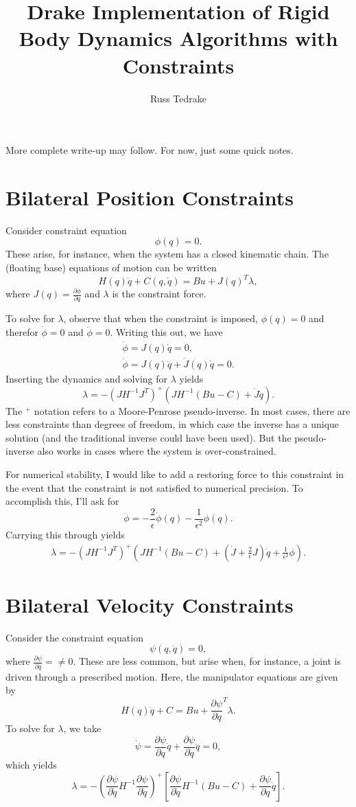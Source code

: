 \documentclass{article}
\title{Drake Implementation of Rigid Body Dynamics Algorithms with Constraints}
\author{Russ Tedrake}
\newcommand{\pd}[2]{\frac{\partial #1}{\partial #2}}
\begin{document}
\maketitle

More complete write-up may follow.  For now, just some quick notes.


\section{Bilateral Position Constraints}

Consider constraint equation $$\phi(q) = 0.$$  These arise, for
instance, when the system has a closed kinematic chain.  
The (floating base) equations of motion can be written 
$$H(q)\ddot{q} + C(q,\dot{q}) = B u + J(q)^T \lambda,$$
where $J(q) = \pd{\phi}{q}$ and $\lambda$ is the constraint force.

To solve for $\lambda$, observe that when the constraint is imposed, 
$\phi(q)=0$ and therefor $\dot{\phi}=0$ and $\ddot{\phi}=0$.  Writing
this out, we have \begin{gather*}\dot{\phi} = J(q)\dot{q}=0,\\
  \ddot{\phi} = J(q) \ddot{q} + \dot{J}(q) \dot{q} = 0.\end{gather*}
Inserting the dynamics and solving for $\lambda$ yields $$\lambda =- (J
H^{-1} J^T)^+ (J H^{-1} (Bu - C) + \dot{J}\dot{q}).$$ The
$^+$ notation refers to a Moore-Penrose pseudo-inverse.  In most cases, there
are less constraints than degrees of freedom, in which case the
inverse has a unique solution (and the traditional inverse could have
been used).  But the pseudo-inverse also works in cases where the
system is over-constrained. 

For numerical stability, I would like to add a restoring force to
this constraint in the event that the constraint is not satisfied to
numerical precision.  To accomplish this, I'll ask for $$\ddot\phi =
-\frac{2}{\epsilon} \dot\phi(q) - \frac{1}{\epsilon^2} \phi(q).$$
Carrying this through
yields 
\begin{gather*}
\lambda =- (J
H^{-1} J^T)^+ (J H^{-1} (Bu - C) + (\dot{J} + \frac{2}{\epsilon}
J)\dot{q} + \frac{1}{\epsilon^2} \phi).
\end{gather*}


\section{Bilateral Velocity Constraints}

Consider the constraint equation 
$$\psi(q,\dot{q}) = 0,$$
where $\pd{\psi}{\dot{q}} =\ne 0.$  These are less common, but arise
when, for instance, a joint is driven through a prescribed motion.  
Here, the manipulator equations are given by $$H(q)\ddot{q} + C = B u
+ \pd{\psi}{\dot{q}}^T \lambda.$$
To solve for $\lambda$, we take $$\dot{\psi} = \pd{\psi}{q} \dot{q} +
\pd{\psi}{\dot{q}}\ddot{q} = 0,$$ which yields
$$\lambda = - \left( \pd{\psi}{\dot{q}} H^{-1} \pd{\psi}{\dot{q}}
  \right)^+ \left[ \pd{\psi}{\dot{q}} H^{-1} (Bu - C) + \pd{\psi}{q}
    \dot{q} \right].$$
 
\end{document}
